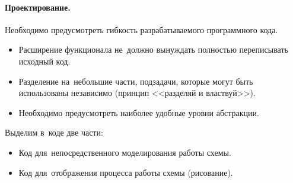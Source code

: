 \paragraph{Проектирование.}
Необходимо предусмотреть гибкость разрабатываемого программного кода.
\begin{itemize}
    \item Расширение функционала не~должно вынуждать полностью переписывать исходный код.
    \item Разделение на~небольшие части, подзадачи, которые могут быть использованы независимо (принцип <<разделяй и властвуй>>).
    \item Необходимо предусмотреть наиболее удобные уровни абстракции.
\end{itemize}

\bigskip Выделим в~коде две части:
\begin{itemize}
    \item Код для~непосредственного моделирования работы схемы.
    \item Код для~отображения процесса работы схемы (рисование).
\end{itemize}

